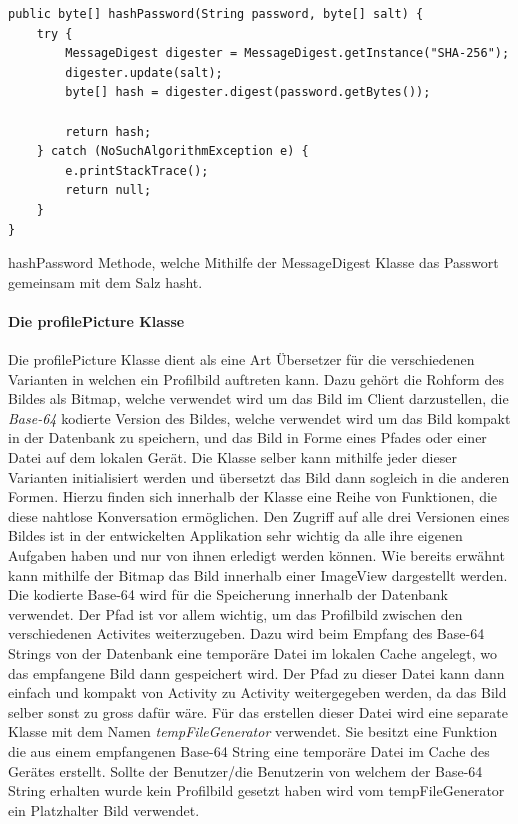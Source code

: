 \documentclass[a4paper,11pt]{report}
\newenvironment{code}{\captionsetup{type=figure}}{}
\begin{document}
			
\begin{code}
	\begin{center}
		\begin{verbatim}
public byte[] hashPassword(String password, byte[] salt) {
	try {
		MessageDigest digester = MessageDigest.getInstance("SHA-256");
		digester.update(salt);
		byte[] hash = digester.digest(password.getBytes());
					
		return hash;
	} catch (NoSuchAlgorithmException e) {
		e.printStackTrace();
		return null;
	}
}
	\end{verbatim}
	\caption{hashPassword Methode, welche Mithilfe der MessageDigest Klasse das Passwort gemeinsam mit dem Salz hasht.}\label{java:hashPassword}
	\end{center}
\end{code}

				\paragraph{Die profilePicture Klasse}
				Die profilePicture Klasse dient als eine Art Übersetzer für die verschiedenen Varianten in welchen ein Profilbild auftreten kann. Dazu gehört die Rohform des Bildes als Bitmap, welche verwendet wird um das Bild im Client darzustellen, die \emph{Base-64} kodierte Version des Bildes, welche verwendet wird um das Bild kompakt in der Datenbank zu speichern, und das Bild in Forme eines Pfades oder einer Datei auf dem lokalen Gerät. Die Klasse selber kann mithilfe jeder dieser Varianten initialisiert werden und \glqq übersetzt\grqq{} das Bild dann sogleich in die anderen Formen. Hierzu finden sich innerhalb der Klasse eine Reihe von Funktionen, die diese nahtlose Konversation ermöglichen. Den Zugriff auf alle drei Versionen eines Bildes ist in der entwickelten Applikation sehr wichtig da alle ihre eigenen Aufgaben haben und nur von ihnen erledigt werden können. Wie bereits erwähnt kann mithilfe der Bitmap das Bild innerhalb einer ImageView dargestellt werden. Die kodierte Base-64 wird für die Speicherung innerhalb der Datenbank verwendet. Der Pfad ist vor allem wichtig, um das Profilbild zwischen den verschiedenen Activites weiterzugeben. Dazu wird beim Empfang des Base-64 Strings von der Datenbank eine temporäre Datei im lokalen Cache angelegt, wo das empfangene Bild dann gespeichert wird. Der Pfad zu dieser Datei kann dann einfach und kompakt von Activity zu Activity weitergegeben werden, da das Bild selber sonst zu gross dafür wäre. Für das erstellen dieser Datei wird eine separate Klasse mit dem Namen \emph{tempFileGenerator} verwendet. Sie besitzt eine Funktion die aus einem empfangenen Base-64 String eine temporäre Datei im Cache des Gerätes erstellt. Sollte der Benutzer/die Benutzerin von welchem der Base-64 String erhalten wurde kein Profilbild gesetzt haben wird vom tempFileGenerator ein Platzhalter Bild verwendet.
	
\end{document}
